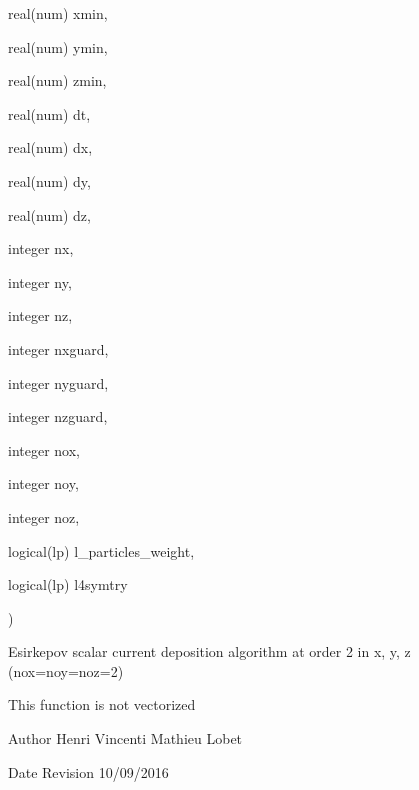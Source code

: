 {\begin{DoxyParamCaption}
\item[{real(num)}]{xmin, }
\item[{real(num)}]{ymin, }
\item[{real(num)}]{zmin, }
\item[{real(num)}]{dt, }
\item[{real(num)}]{dx, }
\item[{real(num)}]{dy, }
\item[{real(num)}]{dz, }
\item[{integer}]{nx, }
\item[{integer}]{ny, }
\item[{integer}]{nz, }
\item[{integer}]{nxguard, }
\item[{integer}]{nyguard, }
\item[{integer}]{nzguard, }
\item[{integer}]{nox, }
\item[{integer}]{noy, }
\item[{integer}]{noz, }
\item[{logical(lp)}]{l\+\_\+particles\+\_\+weight, }
\item[{logical(lp)}]{l4symtry}
\end{DoxyParamCaption}
)}\hypertarget{current__deposition_8_f90_a1b0279f68e8d25ed75dea74ec525c04b}{}\label{current__deposition_8_f90_a1b0279f68e8d25ed75dea74ec525c04b}


Esirkepov scalar current deposition algorithm at order 2 in x, y, z (nox=noy=noz=2) 

This function is not vectorized

\begin{DoxyAuthor}{Author}
Henri Vincenti Mathieu Lobet
\end{DoxyAuthor}
\begin{DoxyDate}{Date}
Revision 10/09/2016
\end{DoxyDate}


